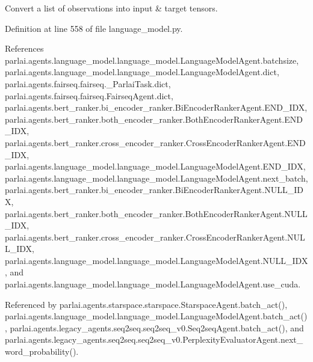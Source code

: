 \begin{DoxyVerb}Convert a list of observations into input & target tensors.\end{DoxyVerb}
 

Definition at line 558 of file language\+\_\+model.\+py.



References parlai.\+agents.\+language\+\_\+model.\+language\+\_\+model.\+Language\+Model\+Agent.\+batchsize, parlai.\+agents.\+language\+\_\+model.\+language\+\_\+model.\+Language\+Model\+Agent.\+dict, parlai.\+agents.\+fairseq.\+fairseq.\+\_\+\+Parlai\+Task.\+dict, parlai.\+agents.\+fairseq.\+fairseq.\+Fairseq\+Agent.\+dict, parlai.\+agents.\+bert\+\_\+ranker.\+bi\+\_\+encoder\+\_\+ranker.\+Bi\+Encoder\+Ranker\+Agent.\+E\+N\+D\+\_\+\+I\+DX, parlai.\+agents.\+bert\+\_\+ranker.\+both\+\_\+encoder\+\_\+ranker.\+Both\+Encoder\+Ranker\+Agent.\+E\+N\+D\+\_\+\+I\+DX, parlai.\+agents.\+bert\+\_\+ranker.\+cross\+\_\+encoder\+\_\+ranker.\+Cross\+Encoder\+Ranker\+Agent.\+E\+N\+D\+\_\+\+I\+DX, parlai.\+agents.\+language\+\_\+model.\+language\+\_\+model.\+Language\+Model\+Agent.\+E\+N\+D\+\_\+\+I\+DX, parlai.\+agents.\+language\+\_\+model.\+language\+\_\+model.\+Language\+Model\+Agent.\+next\+\_\+batch, parlai.\+agents.\+bert\+\_\+ranker.\+bi\+\_\+encoder\+\_\+ranker.\+Bi\+Encoder\+Ranker\+Agent.\+N\+U\+L\+L\+\_\+\+I\+DX, parlai.\+agents.\+bert\+\_\+ranker.\+both\+\_\+encoder\+\_\+ranker.\+Both\+Encoder\+Ranker\+Agent.\+N\+U\+L\+L\+\_\+\+I\+DX, parlai.\+agents.\+bert\+\_\+ranker.\+cross\+\_\+encoder\+\_\+ranker.\+Cross\+Encoder\+Ranker\+Agent.\+N\+U\+L\+L\+\_\+\+I\+DX, parlai.\+agents.\+language\+\_\+model.\+language\+\_\+model.\+Language\+Model\+Agent.\+N\+U\+L\+L\+\_\+\+I\+DX, and parlai.\+agents.\+language\+\_\+model.\+language\+\_\+model.\+Language\+Model\+Agent.\+use\+\_\+cuda.



Referenced by parlai.\+agents.\+starspace.\+starspace.\+Starspace\+Agent.\+batch\+\_\+act(), parlai.\+agents.\+language\+\_\+model.\+language\+\_\+model.\+Language\+Model\+Agent.\+batch\+\_\+act(), parlai.\+agents.\+legacy\+\_\+agents.\+seq2seq.\+seq2seq\+\_\+v0.\+Seq2seq\+Agent.\+batch\+\_\+act(), and parlai.\+agents.\+legacy\+\_\+agents.\+seq2seq.\+seq2seq\+\_\+v0.\+Perplexity\+Evaluator\+Agent.\+next\+\_\+word\+\_\+probability().

